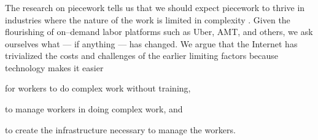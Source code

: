 \documentclass[trackingWork]{subfiles}
\begin{document}
\subsubsection{\whatchanged}
\begin{comment}
  mangeerial overhead limits, so what's different
  more people can now do complex work without training (more complex)
  parts of management can be automated (more firms)
  cheaper to create the infrastructure (more complex)
\end{comment}

The research on piecework tells us that
we should expect piecework to thrive in industries where
the nature of the work is limited in complexity
\cite{Brown01041990}.
Given the flourishing of on--demand labor platforms such as
Uber, AMT, and others, we ask ourselves
what --- if anything --- has changed.
We argue that
the Internet has trivialized
the costs and challenges of the earlier limiting factors
because technology makes it easier
\begin{inlinelist}
\item for workers to do complex work without training,
\item to manage workers in doing complex work, and 
\item to create the infrastructure necessary to manage the workers.
\end{inlinelist}
\end{document}
